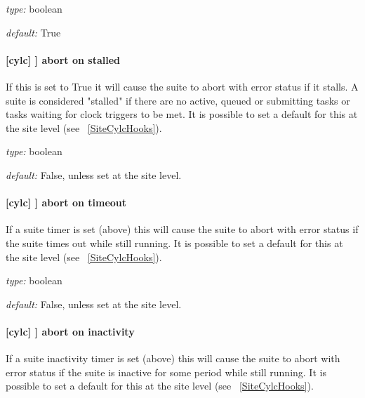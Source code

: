 \begin{myitemize}
    \item {\em type:} boolean
    \item {\em default:} True
\end{myitemize}

\paragraph[abort on stalled]{[cylc] \textrightarrow [[events]] \textrightarrow abort on stalled}

If this is set to True it will cause the suite to abort with error status
if it stalls. A suite is considered "stalled" if there are no active,
queued or submitting tasks or tasks waiting for clock triggers to be met. It is
possible to set a default for this at the site level
(see ~\ref{SiteCylcHooks}).

\begin{myitemize}
    \item {\em type:} boolean
    \item {\em default:} False, unless set at the site level.
\end{myitemize}

\paragraph[abort on timeout]{[cylc] \textrightarrow [[events]] \textrightarrow abort on timeout}

If a suite timer is set (above) this will cause the suite to abort with
error status if the suite times out while still running. It is possible to set
a default for this at the site level (see ~\ref{SiteCylcHooks}).

\begin{myitemize}
    \item {\em type:} boolean
    \item {\em default:} False, unless set at the site level.
\end{myitemize}

\paragraph[abort on inactivity]{[cylc] \textrightarrow [[events]] \textrightarrow abort on inactivity}

If a suite inactivity timer is set (above) this will cause the suite to abort
with error status if the suite is inactive for some period while still running.
It is possible to set a default for this at the site level
(see ~\ref{SiteCylcHooks}).

